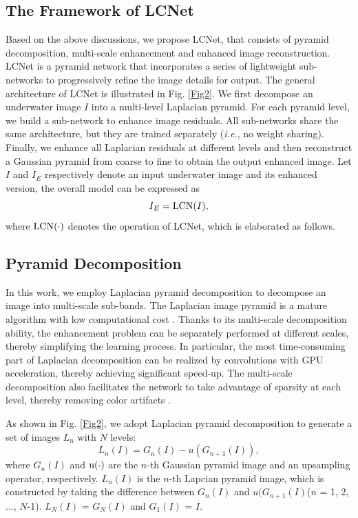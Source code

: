 \documentclass[journal]{IEEEtran}
\begin{document}
\subsection{The Framework of LCNet}
Based on the above discussions, we propose LCNet, that consists of pyramid decomposition, multi-scale enhancement and enhanced image reconstruction. LCNet is a pyramid network that incorporates a series of lightweight sub-networks to progressively refine the image details for output. The general architecture of LCNet is illustrated in Fig. \ref{Fig2}. We first decompose an underwater image \(I\) into a multi-level Laplacian pyramid. For each pyramid level, we build a sub-network to enhance image residuals. All sub-networks share the same architecture, but they are trained separately (\textit{i.e.}, no weight sharing). Finally, we enhance all Laplacian residuals at different levels and then reconstruct a Gaussian pyramid from coarse to fine to obtain the output enhanced image. Let \(I\) and \(I_{E}\) respectively denote an input underwater image and its enhanced version, the overall model can be expressed as
\begin{equation}
 I_{E}={\rm LCN}(I),
\end{equation}
where \(\rm{LCN(\cdot)}\) denotes the operation of LCNet, which is elaborated as follows.


\subsection{Pyramid Decomposition}
In this work, we employ Laplacian pyramid decomposition to decompose an image into multi-scale sub-bands. The Laplacian image pyramid is a mature algorithm with low computational cost \cite{lai2018fast}. Thanks to its multi-scale decomposition ability, the enhancement problem can be separately performed at different scales, thereby simplifying the learning process. In particular, the most time-consuming part of Laplacian decomposition can be realized by convolutions with GPU acceleration, thereby achieving significant speed-up. The multi-scale decomposition also facilitates the network to take advantage of sparsity at each level, thereby removing color artifacts \cite{iqbal2020underwater}.

As shown in Fig. \ref{Fig2}, we adopt Laplacian pyramid decomposition to generate a set of images \(L_{n}\) with \(N\) levels:
\begin{equation}
L_{n}\left ( I\right )=G_{n}\left ( I \right )-u\left ( G_{n+1}\left ( I\right )\right),
 \label{equation2} 
\end{equation}
where \(G_{n}(I)\) and \(\rm{u(\cdot)}\) are the \(n\)-th Gaussian pyramid image and an upsampling operator, respectively. \(L_{n}(I)\) is the \(n\)-th Lapcian pyramid image, which is constructed by taking the difference between \(G_{n}(I)\) and \(u(G_{n+1}(I)\)(\(n\) = 1, 2, ..., \(N\)-1). \(L_{N}(I)\) = \(G_{N}(I)\) and \(G_{1}(I)\) = \(I\).
\end{document}

